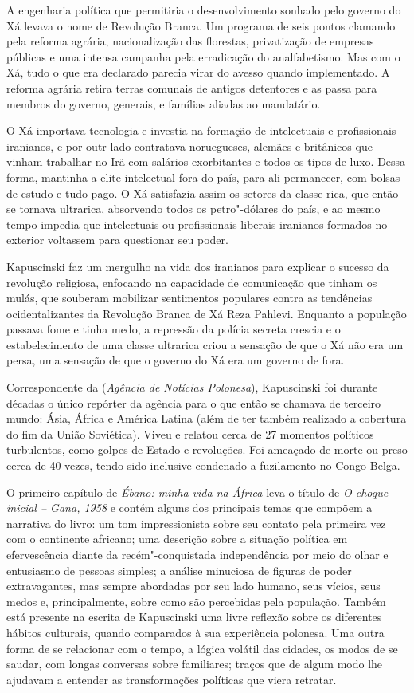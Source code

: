 A engenharia política que permitiria o desenvolvimento sonhado pelo
governo do Xá levava o nome de Revolução Branca. Um programa de seis
pontos clamando pela reforma agrária, nacionalização das florestas,
privatização de empresas públicas e uma intensa campanha pela
erradicação do analfabetismo. Mas com o Xá, tudo o que era declarado
parecia virar do avesso quando implementado. A reforma agrária retira
terras comunais de antigos detentores e as passa para membros do
governo, generais, e famílias aliadas ao mandatário.

O Xá importava
tecnologia e investia na formação de intelectuais e profissionais
iranianos, e por outr lado contratava noruegueses, alemães e britânicos que
vinham trabalhar no Irã com salários exorbitantes e todos os tipos de
luxo. Dessa forma, mantinha a elite intelectual fora do país, para ali
permanecer, com bolsas de estudo e tudo pago. O Xá satisfazia assim os setores da
classe rica, que então se tornava ultrarica, absorvendo todos os
petro"-dólares do país, e ao mesmo tempo impedia que intelectuais ou
profissionais liberais iranianos formados no exterior voltassem para
questionar seu poder.

Kapuscinski faz um mergulho na vida dos iranianos para
explicar o sucesso da revolução religiosa, enfocando na capacidade de
comunicação que tinham os mulás, que souberam mobilizar sentimentos
populares contra as tendências ocidentalizantes da Revolução Branca de
Xá Reza Pahlevi. Enquanto a população passava fome e tinha medo, a
repressão da polícia secreta crescia e o estabelecimento de uma classe
ultrarica criou a sensação de que o Xá não era um persa, uma sensação
de que o governo do Xá era um governo de fora.

\asterisc

Correspondente da  (\emph{Agência de Notícias Polonesa}), Kapuscinski foi
durante décadas o único repórter da agência para o que então se chamava
de terceiro mundo: Ásia, África e América Latina (além de ter também
realizado a cobertura do fim da União Soviética). Viveu e relatou cerca
de 27 momentos políticos turbulentos, como golpes de Estado e
revoluções. Foi ameaçado de morte ou preso cerca de 40 vezes, tendo sido
inclusive condenado a fuzilamento no Congo Belga.

O primeiro capítulo de \emph{Ébano: minha vida na África} leva o título
de \emph{O choque inicial -- Gana, 1958} e contém alguns dos principais
temas que compõem a narrativa do livro: um tom impressionista sobre seu
contato pela primeira vez com o continente africano; uma descrição sobre a situação
política em efervescência diante da recém"-conquistada independência
por meio do olhar e entusiasmo de pessoas simples; a análise minuciosa de
figuras de poder extravagantes, mas sempre abordadas por seu lado
humano, seus vícios, seus medos e, principalmente, sobre como são
percebidas pela população. Também está presente na escrita de
Kapuscinski uma livre reflexão sobre os diferentes hábitos culturais,
quando comparados à sua experiência polonesa. Uma outra forma de se
relacionar com o tempo, a lógica volátil das cidades, os modos de se
saudar, com longas conversas sobre familiares; traços que
de algum modo lhe ajudavam a entender as transformações políticas que
viera retratar.

